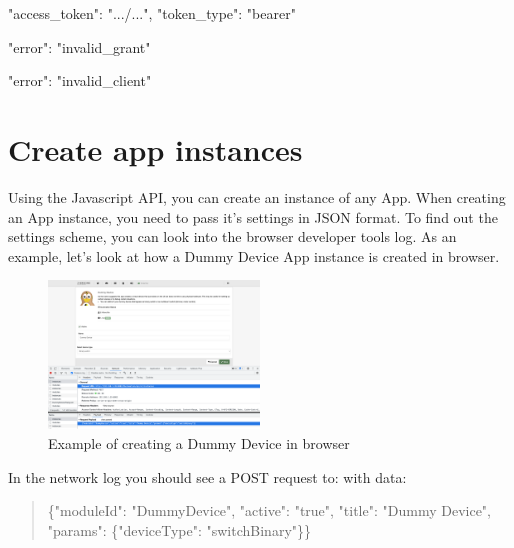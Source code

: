 \begin{listingverbatim}
{
    "access_token": ".../...",
    "token_type": "bearer"
}
\end{listingverbatim}

\begin{listingverbatim}
{
    "error": "invalid_grant"
}
\end{listingverbatim}

\begin{listingverbatim}
{
    "error": "invalid_client"
}
\end{listingverbatim}

\section{Create app instances}
\label{createappinstances}

Using the Javascript API, you can create an instance of any App. When creating an App instance, you need to pass it's settings in JSON format. To find out the settings scheme, you can look into the browser developer tools log. As an example, let's look at how a Dummy Device App instance is created in browser.

\begin{figure}
\begin{center}
\includegraphics[width=0.5\textwidth]{pngs/cap13/requst-api-dummy-device.png}
\caption{Example of creating a Dummy Device in browser}
\label{requst_api_dummy_device}
\end{center}
\end{figure}

In the network log you should see a POST request to: 
with data:
{\scriptsize
\begin{quote} 
\{"moduleId": "DummyDevice", "active": "true", "title": "Dummy Device", "params": \{"deviceType": "switchBinary"\}\}
\end{quote}
}

